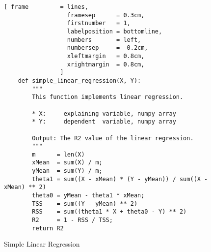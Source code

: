 \begin{figure}[!ht]
\centering
\begin{Verbatim}[ frame         = lines, 
                  framesep      = 0.3cm, 
                  firstnumber   = 1,
                  labelposition = bottomline,
                  numbers       = left,
                  numbersep     = -0.2cm,
                  xleftmargin   = 0.8cm,
                  xrightmargin  = 0.8cm,
                ]
    def simple_linear_regression(X, Y):
        """
        This function implements linear regression.
        
        * X:     explaining variable, numpy array
        * Y:     dependent  variable, numpy array   
    
        Output: The R2 value of the linear regression.
        """
        m      = len(X)
        xMean  = sum(X) / m;
        yMean  = sum(Y) / m;
        theta1 = sum((X - xMean) * (Y - yMean)) / sum((X - xMean) ** 2)
        theta0 = yMean - theta1 * xMean;
        TSS    = sum((Y - yMean) ** 2)
        RSS    = sum((theta1 * X + theta0 - Y) ** 2)
        R2     = 1 - RSS / TSS;
        return R2
\end{Verbatim}
\vspace*{-0.3cm}
\caption{Simple Linear Regression}
\label{fig:simple_linear_regression.py}
\end{figure}


